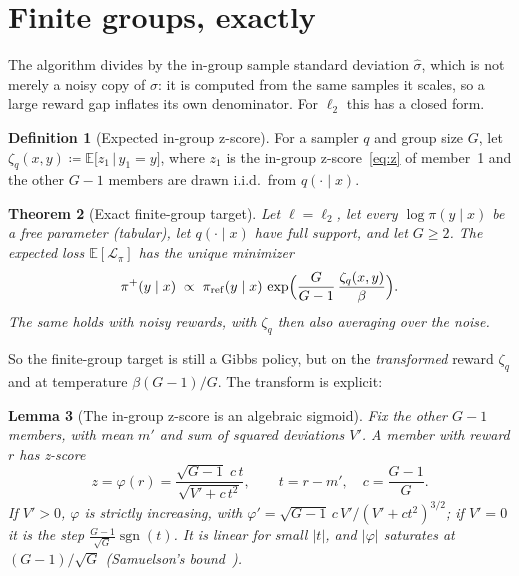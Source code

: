 \documentclass[11pt]{article}
\newtheorem{theorem}{Theorem}
\newtheorem{lemma}[theorem]{Lemma}
\theoremstyle{definition}
\newtheorem{definition}[theorem]{Definition}
\theoremstyle{remark}
\newcommand{\E}{\mathbb{E}}
\newcommand{\pref}{\pi_{\mathrm{ref}}}
\newcommand{\sgn}{\operatorname{sgn}}
\newcommand{\cL}{\mathcal{L}}
\newcommand{\1}{\mathbb{1}}
\begin{document}
\section{Finite groups, exactly}\label{sec:finiteG}

The algorithm divides by the in-group sample standard deviation $\hat\sigma$, which
is not merely a noisy copy of $\sigma$: it is computed from the same samples it
scales, so a large reward gap inflates its own denominator. For $\ell_2$ this has a
closed form.

\begin{definition}[Expected in-group z-score]\label{def:zeta}
For a sampler $q$ and group size $G$, let
$\zeta_q(x,y)\coloneqq\E\bigl[z_1\,\big|\,y_1=y\bigr]$, where $z_1$ is the in-group
z-score~\eqref{eq:z} of member~1 and the other $G-1$ members are drawn i.i.d.\ from
$q(\cdot\mid x)$.
\end{definition}

\begin{theorem}[Exact finite-group target]\label{thm:finiteG}
Let $\ell=\ell_2$, let every $\log\pi(y\mid x)$ be a free parameter (tabular), let
$q(\cdot\mid x)$ have full support, and let $G\ge2$. The expected loss $\E[\cL_\pi]$ has
the unique minimizer
\begin{equation}\label{eq:finiteG}
  \pi^+(y\mid x)\;\propto\;\pref(y\mid x)\,\exp\Bigl(\frac{G}{G-1}\,\frac{\zeta_q(x,y)}{\beta}\Bigr).
\end{equation}
The same holds with noisy rewards, with $\zeta_q$ then also averaging over the noise.
\end{theorem}

So the finite-group target is still a Gibbs policy, but on the \emph{transformed}
reward $\zeta_q$ and at temperature $\beta(G-1)/G$. The transform is explicit:

\begin{lemma}[The in-group z-score is an algebraic sigmoid]\label{lem:phi}
Fix the other $G-1$ members, with mean $m'$ and sum of squared deviations $V'$. A
member with reward $r$ has z-score
\[
  z=\varphi(r)=\frac{\sqrt{G-1}\;c\,t}{\sqrt{V'+c\,t^2}},\qquad t=r-m',\quad c=\frac{G-1}{G}.
\]
If $V'>0$, $\varphi$ is strictly increasing, with $\varphi'=\sqrt{G-1}\,c\,V'/(V'+ct^2)^{3/2}$;
if $V'=0$ it is the step $\frac{G-1}{\sqrt G}\sgn(t)$. It is linear for small $|t|$,
and $|\varphi|$ saturates at $(G-1)/\sqrt G$ (Samuelson's bound~\cite{samuelson}).
\end{lemma}
\end{document}

